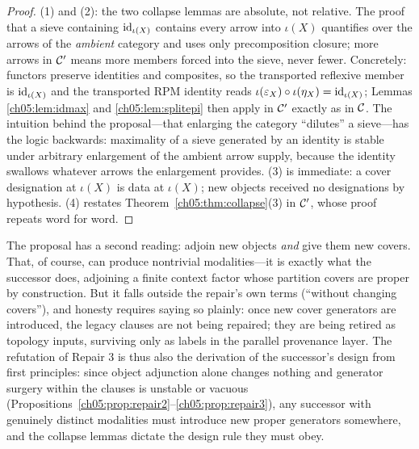 \begin{proof}
(1) and (2): the two collapse lemmas are absolute, not relative. The proof
that a sieve containing $\mathrm{id}_{\iota(X)}$ contains every arrow into
$\iota(X)$ quantifies over the arrows of the \emph{ambient} category and
uses only precomposition closure; more arrows in $\mathcal{C}'$ means more members
forced into the sieve, never fewer. Concretely: functors preserve
identities and composites, so the transported reflexive member is
$\mathrm{id}_{\iota(X)}$ and the transported RPM identity reads
$\iota(\varepsilon_X)\circ\iota(\eta_X)=\mathrm{id}_{\iota(X)}$; Lemmas
\ref{ch05:lem:idmax} and \ref{ch05:lem:splitepi} then apply in $\mathcal{C}'$
exactly as in $\mathcal{C}$. The intuition behind the proposal---that enlarging the
category ``dilutes'' a sieve---has the logic backwards: maximality of a
sieve generated by an identity is stable under arbitrary enlargement of the
ambient arrow supply, because the identity swallows whatever arrows the
enlargement provides. (3) is immediate: a cover designation at $\iota(X)$
is data at $\iota(X)$; new objects received no designations by hypothesis.
(4) restates Theorem~\ref{ch05:thm:collapse}(3) in $\mathcal{C}'$, whose proof
repeats word for word.
\end{proof}

\begin{remark}\label{ch05:rem:repair3}
The proposal has a second reading: adjoin new objects \emph{and} give them
new covers. That, of course, can produce nontrivial modalities---it is
exactly what the successor does, adjoining a finite context factor whose
partition covers are proper by construction. But it falls outside the
repair's own terms (``without changing covers''), and honesty requires
saying so plainly: once new cover generators are introduced, the legacy
clauses are not being repaired; they are being retired as topology inputs,
surviving only as labels in the parallel provenance layer. The refutation
of Repair 3 is thus also the derivation of the successor's design from
first principles: since object adjunction alone changes nothing and
generator surgery within the clauses is unstable or vacuous
(Propositions~\ref{ch05:prop:repair2}--\ref{ch05:prop:repair3}), any
successor with genuinely distinct modalities must introduce new proper
generators somewhere, and the collapse lemmas dictate the design rule they
must obey.
\end{remark}

